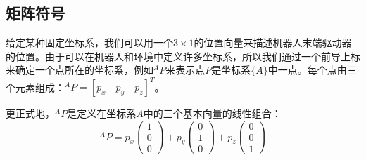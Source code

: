 \subsection{矩阵符号}


给定某种固定坐标系，我们可以用一个$3\times 1$的位置向量来描述机器人末端驱动器的位置。由于可以在机器人和环境中定义许多坐标系，所以我们通过一个前导上标来确定一个点所在的坐标系，例如$^AP$来表示点$P$是坐标系$\{A\}$中一点。每个点由三个元素组成：$^AP=[p_x\quad p_y\quad p_z]^T$。

更正式地，$ ^ AP $是定义在坐标系$A$中的三个基本向量的线性组合：
\begin{equation}
^AP=p_x\left(\begin{array}{c}1\\0\\0\end{array}\right)+p_y\left(\begin{array}{c}0\\1\\0\end{array}\right)+p_z\left(\begin{array}{c}0\\0\\1\end{array}\right)\label{eq:basis}
\end{equation}



